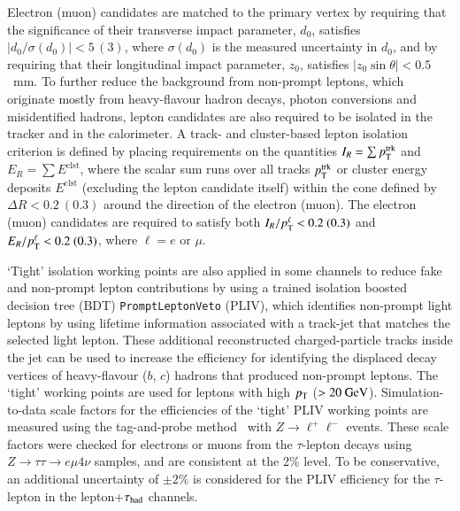 Electron (muon) candidates are matched to the primary vertex by requiring that the significance of their transverse impact parameter, $d_0$, 
satisfies $|d_0/\sigma(d_0)|<5\,(3)$, where $\sigma(d_0)$ is the measured uncertainty in $d_0$,
and by requiring that their longitudinal impact parameter, $z_0$, satisfies $|z_0 \sin\theta|<0.5$~mm.
To further reduce the background from non-prompt leptons, which originate mostly from heavy-flavour hadron decays, photon conversions and misidentified hadrons,
lepton candidates are also required to be isolated in the tracker and in the calorimeter.
A track- and cluster-based lepton isolation criterion is defined by placing requirements on the quantities $I_R = \sum p_{\text{T}}^{\textrm{trk}}$ and $E_R = \sum E^{\textrm{clst}}$, where
the scalar sum runs over all tracks $p_{\text{T}}^{\textrm{trk}}$ or cluster energy deposits $E^{\textrm{clst}}$ (excluding the lepton candidate itself)
within the cone defined by $\Delta R<0.2~(0.3)$ around the %
direction of the electron (muon). The electron (muon) candidates are required to satisfy both
$I_R/p_{\text{T}}^\ell < 0.2~(0.3)$ and $E_R/p_{\text{T}}^\ell < 0.2~(0.3)$, where $\ell=e$ or $\mu$.

`Tight' isolation working points are also applied in some channels to reduce fake and non-prompt lepton contributions by using a trained isolation boosted decision tree (BDT)
\texttt{PromptLeptonVeto} (PLIV), which identifies non-prompt light leptons by using lifetime information associated with a track-jet that matches the selected light lepton.
These additional reconstructed charged-particle tracks inside the jet can be
used to increase the efficiency for identifying the displaced decay vertices of heavy-flavour ($b$, $c$) hadrons that produced non-prompt leptons.
The `tight' working points are used for leptons with high $p_{\text{T}}$ ($>20~\text{GeV}$).
Simulation-to-data scale factors for the efficiencies of the `tight' PLIV working points are measured using the tag-and-probe method~\cite{PERF-2016-01}
with $Z\rightarrow \ell^+\ell^-$ events. These scale factors were checked for electrons or muons from the $\tau$-lepton decays
using $Z\rightarrow\tau\tau\rightarrow e\mu4\nu$ samples, and are consistent at the 2\% level. To be conservative, an
additional uncertainty of $\pm 2\%$ is considered for the PLIV efficiency for the $\tau$-lepton in the lepton+$\tau_\text{had}$ channels.

